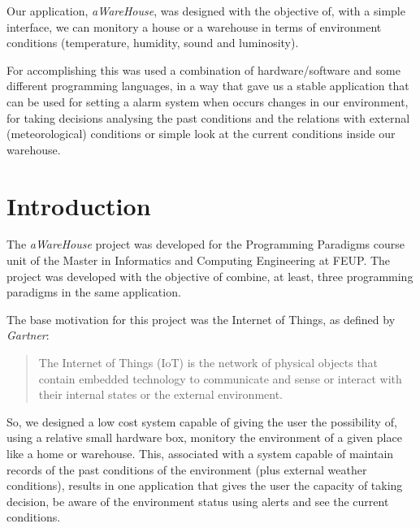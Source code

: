 \documentclass[12pt]{report}
\begin{document}
Our application, \textit{aWareHouse}, was designed with the objective of, with a simple interface, we can monitory a house or a warehouse in terms of environment conditions (temperature, humidity, sound and luminosity). 

For accomplishing this was used a combination of hardware/software and some different programming languages, in a way that gave us a stable application that can be used for setting a alarm system when occurs changes in our environment, for taking decisions analysing the past conditions and the relations with external (meteorological) conditions or simple look at the current conditions inside our warehouse.


\newpage
\tableofcontents
\newpage

\chapter{Introduction}

The \textit{aWareHouse} project was developed for the Programming Paradigms course unit of the Master in Informatics and Computing Engineering at FEUP. The project was developed with the objective of combine, at least, three programming paradigms in the same application.

The base motivation for this project was the Internet of Things, as defined by \textit{Gartner}:

\blockquote{The Internet of Things (IoT) is the network of physical objects that contain embedded technology to communicate and sense or interact with their internal states or the external environment.}

So, we designed a low cost system capable of giving the user the possibility of, using a relative small hardware box, monitory the environment of a given place like a home or warehouse. This, associated with a system capable of maintain records of the past conditions of the environment (plus external weather conditions), results in one application that gives the user the capacity of taking decision, be aware of the environment status using alerts and see the current conditions.
\end{document}

